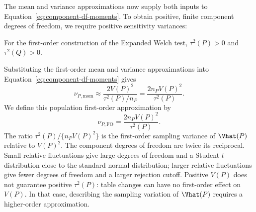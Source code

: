 The mean and variance approximations now supply both inputs to
Equation~\eqref{eq:component-df-moments}. To obtain positive, finite
component degrees of freedom, we require positive sensitivity variances:
\begin{assumption}
For the first-order construction of the Expanded Welch test,
\(\tau^2(P)>0\) and \(\tau^2(Q)>0\).
\end{assumption}
Substituting the first-order mean and variance approximations into
Equation~\eqref{eq:component-df-moments} gives
\begin{equation*}
  \nu_{P,\mathrm{mom}}
  \approx\frac{2V(P)^2}{\tau^2(P)/n_P}
  =\frac{2n_PV(P)^2}{\tau^2(P)}.
\end{equation*}
We define this population first-order approximation by
\begin{equation}
  \boxed{
  \nu_{P,\mathrm{FO}}
  =
  \frac{2n_PV(P)^2}{\tau^2(P)}
  }.
  \label{eq:population-component-df}
\end{equation}
The ratio \(\tau^2(P)/\{n_PV(P)^2\}\) is the first-order sampling
variance of \(\Vhat(P)\) relative to \(V(P)^2\). The component degrees
of freedom are twice its reciprocal. Small relative fluctuations give
large degrees of freedom and a Student \(t\) distribution close to the
standard normal distribution; larger relative fluctuations give fewer
degrees of freedom and a larger rejection cutoff.
Positive \(V(P)\) does not guarantee positive \(\tau^2(P)\): table changes
can have no first-order effect on \(V(P)\). In that case, describing the
sampling variation of \(\Vhat(P)\) requires a higher-order approximation.

\medskip
{}

